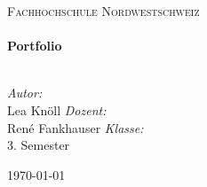\begin{titlepage}
\begin{center}
\textsc{\LARGE Fachhochschule Nordwestschweiz}\\[1.5cm]
\HRule \\[0.4cm]
{ \huge \bfseries Portfolio}\\[0.4cm]
\HRule \\[1.5cm]
\begin{minipage}{1.2\textwidth}
\begin{flushleft} \large
\emph{Autor:}\\
Lea Knöll
\newline
\newline
\emph{Dozent:} \\
René Fankhauser
\newline
\newline
\emph{Klasse:} \\
3. Semester\\
\end{flushleft}
\end{minipage}
\vfill
{\large \today}
\end{center}
\end{titlepage}
